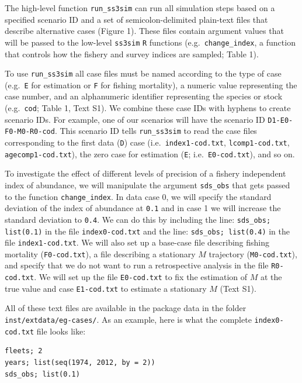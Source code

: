 \documentclass[12pt]{article}
\begin{document}
The high-level function \texttt{run\_ss3sim} can run all simulation steps based on a specified scenario ID and a set of semicolon-delimited plain-text files that describe alternative cases (Figure 1). These files contain argument values that will be passed to the low-level \texttt{ss3sim} \texttt{R} functions (e.g.~\texttt{change\_index}, a function that controls how the fishery and survey indices are sampled; Table 1).

To use \texttt{run\_ss3sim} all case files must be named according to the type of case (e.g.~\texttt{E} for estimation or \texttt{F} for fishing mortality), a numeric value representing the case number, and an alphanumeric identifier representing the species or stock (e.g.~\texttt{cod}; Table 1, Text S1). We combine these case IDs with hyphens to create scenario IDs. For example, one of our scenarios will have the scenario ID \texttt{D1-E0-F0-M0-R0-cod}. This scenario ID tells \texttt{run\_ss3sim} to read the case files corresponding to the first data (\texttt{D}) case (i.e.~\texttt{index1-cod.txt}, \texttt{lcomp1-cod.txt}, \texttt{agecomp1-cod.txt}), the zero case for estimation (\texttt{E}; i.e.~\texttt{E0-cod.txt}), and so on.

To investigate the effect of different levels of precision of a fishery independent index of abundance, we will manipulate the argument \texttt{sds\_obs} that gets passed to the function \texttt{change\_index}. In data case 0, we will specify the standard deviation of the index of abundance at \texttt{0.1} and in case 1 we will increase the standard deviation to \texttt{0.4}. We can do this by including the line: \texttt{sds\_obs; list(0.1)} in the file \texttt{index0-cod.txt} and the line: \texttt{sds\_obs; list(0.4)} in the file \texttt{index1-cod.txt}. We will also set up a base-case file describing fishing mortality (\texttt{F0-cod.txt}), a file describing a stationary $M$ trajectory (\texttt{M0-cod.txt}), and specify that we do not want to run a retrospective analysis in the file \texttt{R0-cod.txt}. We will set up the file \texttt{E0-cod.txt} to fix the estimation of $M$ at the true value and case \texttt{E1-cod.txt} to estimate a stationary $M$ (Text S1).

All of these text files are available in the package data in the folder\\ \texttt{inst/extdata/eg-cases/}. As an example, here is what the complete \texttt{index0-cod.txt} file looks like:


\begin{verbatim}
fleets; 2
years; list(seq(1974, 2012, by = 2))
sds_obs; list(0.1)
\end{verbatim}
\end{document}
